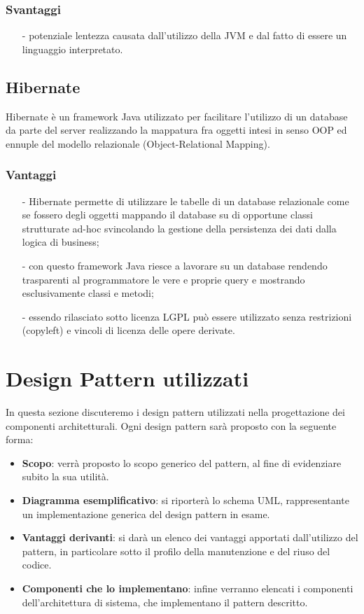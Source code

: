 \subsubsection*{Svantaggi}
\begin{itemize}
\item[-] potenziale lentezza causata dall'utilizzo della JVM e dal fatto di essere un linguaggio interpretato.
\end{itemize}

\subsection{Hibernate}
Hibernate è un framework Java utilizzato per facilitare l'utilizzo di un database da parte del server realizzando la mappatura fra oggetti intesi in senso OOP ed ennuple del modello relazionale (Object-Relational Mapping).

\subsubsection*{Vantaggi}
\begin{itemize}
\item[-] Hibernate permette di utilizzare le tabelle di un database relazionale come se fossero degli oggetti mappando il database su di opportune classi strutturate ad-hoc svincolando la gestione della persistenza dei dati dalla logica di business;
\item[-] con questo framework Java riesce a lavorare su un database rendendo trasparenti al programmatore le vere e proprie query e mostrando esclusivamente classi e metodi;
\item[-] essendo rilasciato sotto licenza LGPL può essere utilizzato senza restrizioni (copyleft) e vincoli di licenza delle opere derivate. 
\end{itemize}
\clearpage

\section{Design Pattern utilizzati}
In questa sezione discuteremo i design pattern utilizzati nella progettazione dei componenti architetturali. Ogni design pattern sarà proposto con la seguente forma:
\begin{itemize}
	\item \textbf{Scopo}: verrà proposto lo scopo generico del pattern, al fine di evidenziare subito la sua utilità.
	\item \textbf{Diagramma esemplificativo}: si riporterà lo schema UML, rappresentante un implementazione generica del design pattern in esame.
	\item \textbf{Vantaggi derivanti}: si darà un elenco dei vantaggi apportati dall'utilizzo del pattern, in particolare sotto il profilo della manutenzione e del riuso del codice.
	\item \textbf{Componenti che lo implementano}: infine verranno elencati i componenti dell'architettura di sistema, che implementano il pattern descritto.
\end{itemize}

